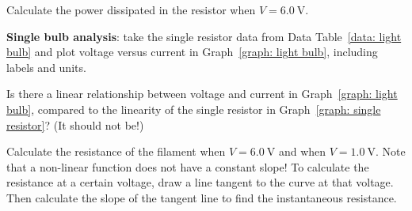 \documentclass[addpoints]{physlabs}
\begin{document}
\begin{postlab}
\begin{solution}[3cm]
    \end{solution}

    \filbreak
    \question[1] Calculate the power dissipated in the resistor when $V=\qty{6.0}{\volt}$.
    \begin{solution}[3cm]
        
    \end{solution}

    \filbreak
    \question[2] \textbf{Single bulb analysis}: take the single resistor data from Data Table~\ref{data: light bulb} and plot voltage versus current in Graph~\ref{graph: light bulb}, including labels and units.

    \begin{center}
    \captionsetup{font=normalsize}
    \end{center}

    \filbreak
    \question[1] Is there a linear relationship between voltage and current in Graph~\ref{graph: light bulb}, compared to the linearity of the single resistor in Graph~\ref{graph: single resistor}? (It should not be!)
    \begin{solution}[1.5cm]
        
    \end{solution}

    \filbreak
    \question[1] Calculate the resistance of the filament when $V=\qty{6.0}{\volt}$ and when $V=\qty{1.0}{\volt}$.
    Note that a non-linear function does not have a constant slope! 
    To calculate the resistance at a certain voltage, draw a line tangent to the curve at that voltage. 
    Then calculate the slope of the tangent line to find the instantaneous resistance.
    \begin{solution}[1.5cm]
        

\end{solution}
\end{postlab}
\end{document}
